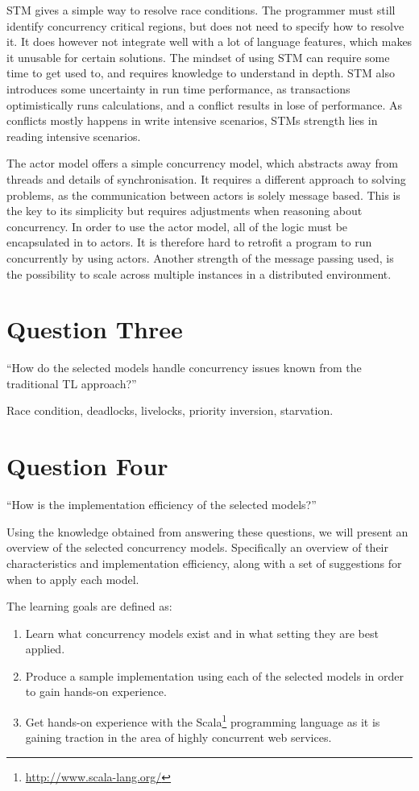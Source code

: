 \ac{STM} gives a simple way to resolve race conditions. The programmer must still identify concurrency critical regions, but does not need to specify how to resolve it. It does however not integrate well with a lot of language features, which makes it unusable for certain solutions. The mindset of using \ac{STM} can require some time to get used to, and requires knowledge to understand in depth. \ac{STM} also introduces some uncertainty in run time performance, as transactions optimistically runs calculations, and a conflict results in lose of performance. As conflicts mostly happens in write intensive scenarios, \acp{STM} strength lies in reading intensive scenarios.

The actor model offers a simple concurrency model, which abstracts away from threads and details of synchronisation. It requires a different approach to solving problems, as the communication between actors is solely message based. This is the key to its simplicity but requires adjustments when reasoning about concurrency. In order to use the actor model, all of the logic must be encapsulated in to actors. It is therefore hard to retrofit a program to run concurrently by using actors. Another strength of the message passing used, is the possibility to scale across multiple instances in a distributed environment.


\section{Question Three}
``How do the selected models handle concurrency issues known from the traditional \ac{TL} approach?''

Race condition, deadlocks, livelocks, priority inversion, starvation.


\section{Question Four}
``How is the implementation efficiency of the selected models?''


Using the knowledge obtained from answering these questions, we will present an overview of the selected concurrency models. Specifically an overview of their characteristics and implementation efficiency, along with a set of suggestions for when to apply each model.




The learning goals are defined as:
\begin{enumerate}
\item Learn what concurrency models exist and in what setting they are best applied.
\item Produce a sample implementation using each of the selected models in order to gain hands-on experience.
\item Get hands-on experience with the Scala\footnote{\url{http://www.scala-lang.org/}} programming language as it is gaining traction in the area of highly concurrent web services.
\end{enumerate}
\worksheetend